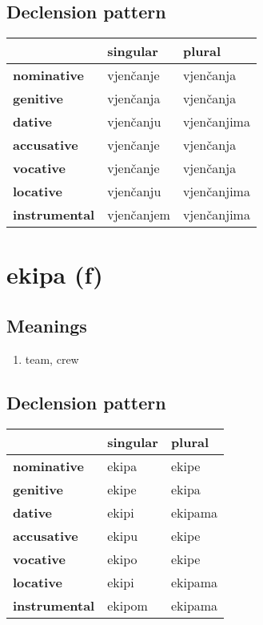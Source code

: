 \subsection*{Declension pattern}
\begin{tabularx}{\linewidth}{Xll}
\toprule
{} &    singular &       plural \\
\midrule
\textbf{nominative  } &   vjenčanje &    vjenčanja \\
\textbf{genitive    } &   vjenčanja &    vjenčanja \\
\textbf{dative      } &   vjenčanju &  vjenčanjima \\
\textbf{accusative  } &   vjenčanje &    vjenčanja \\
\textbf{vocative    } &   vjenčanje &    vjenčanja \\
\textbf{locative    } &   vjenčanju &  vjenčanjima \\
\textbf{instrumental} &  vjenčanjem &  vjenčanjima \\
\bottomrule
\end{tabularx}

\filbreak
\section{ekipa (f)}
\subsection*{Meanings}
\begin{enumerate}
\item team, crew
\end{enumerate}
\subsection*{Declension pattern}
\begin{tabularx}{\linewidth}{Xll}
\toprule
{} & singular &   plural \\
\midrule
\textbf{nominative  } &    ekipa &    ekipe \\
\textbf{genitive    } &    ekipe &    ekipa \\
\textbf{dative      } &    ekipi &  ekipama \\
\textbf{accusative  } &    ekipu &    ekipe \\
\textbf{vocative    } &    ekipo &    ekipe \\
\textbf{locative    } &    ekipi &  ekipama \\
\textbf{instrumental} &   ekipom &  ekipama \\
\bottomrule
\end{tabularx}

